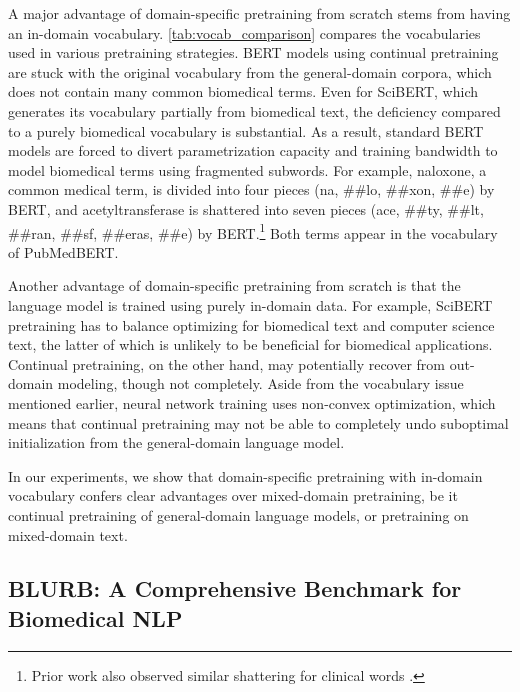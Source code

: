 \documentclass[acmlarge,screen,nonacm]{acmart}
\begin{document}
A major advantage of domain-specific pretraining from scratch stems from having an in-domain vocabulary. 
\autoref{tab:vocab_comparison} compares the vocabularies used in various pretraining strategies. BERT models using continual pretraining are stuck with the original vocabulary from the general-domain corpora, which does not contain many common biomedical terms. 
Even for SciBERT, which generates its vocabulary partially from biomedical text, the deficiency compared to a purely biomedical vocabulary is substantial.
As a result, standard BERT models are forced to divert parametrization capacity and training bandwidth to model biomedical terms using fragmented subwords. 
For example, naloxone, a common medical term, is divided into four pieces (na, \#\#lo, \#\#xon, \#\#e) by BERT, and acetyltransferase is shattered into seven pieces (ace, \#\#ty, \#\#lt, \#\#ran, \#\#sf, \#\#eras, \#\#e) by BERT.\footnote{Prior work also observed similar shattering for clinical words \cite{si&al19}.} Both terms appear in the vocabulary of PubMedBERT.





Another advantage of domain-specific pretraining from scratch is that the language model is trained using purely in-domain data. 
For example, SciBERT pretraining has to balance optimizing for biomedical text and computer science text, the latter of which is unlikely to be beneficial for biomedical applications. 
Continual pretraining, on the other hand, may potentially recover from out-domain modeling, though not completely. Aside from the vocabulary issue mentioned earlier, neural network training uses non-convex optimization, which means that continual pretraining may not be able to completely undo suboptimal initialization from the general-domain language model. 


In our experiments, we show that domain-specific pretraining with in-domain vocabulary confers clear advantages over mixed-domain pretraining, be it continual pretraining of general-domain language models, or pretraining on mixed-domain text.







\subsection{BLURB: A Comprehensive Benchmark for Biomedical NLP}
\end{document}
